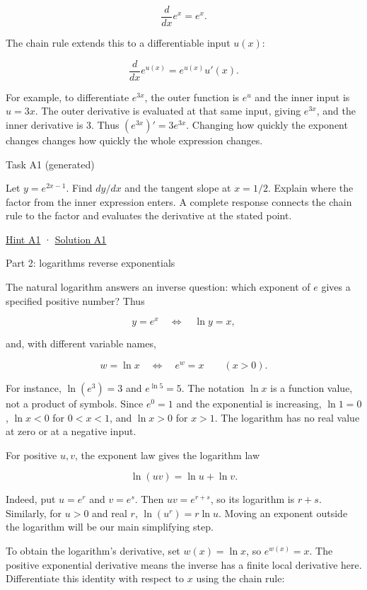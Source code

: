 \documentclass[
  11pt,
]{article}
\providecommand{\gt}{>}
\providecommand{\lt}{<}
\begin{document}
\[
\frac{d}{dx}e^x=e^x.
\]

The chain rule extends this to a differentiable input \(u(x)\):

\[
\frac{d}{dx}e^{u(x)}=e^{u(x)}u'(x).
\]

For example, to differentiate \(e^{3x}\), the outer function is \(e^u\)
and the inner input is \(u=3x\). The outer derivative is evaluated at
that same input, giving \(e^{3x}\), and the inner derivative is 3. Thus
\((e^{3x})'=3e^{3x}\). Changing how quickly the exponent changes changes
how quickly the whole expression changes.

Task A1 (generated)

Let \(y=e^{2x-1}\). Find \(dy/dx\) and the tangent slope at \(x=1/2\).
Explain where the factor from the inner expression enters. A complete
response connects the chain rule to the factor and evaluates the
derivative at the stated point.

\protect\hyperlink{hint-a1}{Hint A1} ·
\protect\hyperlink{solution-a1}{Solution A1}

Part 2: logarithms reverse exponentials

The natural logarithm answers an inverse question: which exponent of
\(e\) gives a specified positive number? Thus

\[
y=e^x\quad\Longleftrightarrow\quad\ln y=x,
\]

and, with different variable names,

\[
w=\ln x\quad\Longleftrightarrow\quad e^w=x\qquad(x\gt 0).
\]

For instance, \(\ln(e^3)=3\) and \(e^{\ln 5}=5\). The notation \(\ln x\)
is a function value, not a product of symbols. Since \(e^0=1\) and the
exponential is increasing, \(\ln1=0\), \(\ln x\lt 0\) for
\(0\lt x\lt 1\), and \(\ln x\gt 0\) for \(x\gt 1\). The logarithm has no
real value at zero or at a negative input.

For positive \(u,v\), the exponent law gives the logarithm law

\[
\ln(uv)=\ln u+\ln v.
\]

Indeed, put \(u=e^r\) and \(v=e^s\). Then \(uv=e^{r+s}\), so its
logarithm is \(r+s\). Similarly, for \(u\gt 0\) and real \(r\),
\(\ln(u^r)=r\ln u\). Moving an exponent outside the logarithm will be
our main simplifying step.

To obtain the logarithm's derivative, set \(w(x)=\ln x\), so
\(e^{w(x)}=x\). The positive exponential derivative means the inverse
has a finite local derivative here. Differentiate this identity with
respect to \(x\) using the chain rule:
\end{document}
